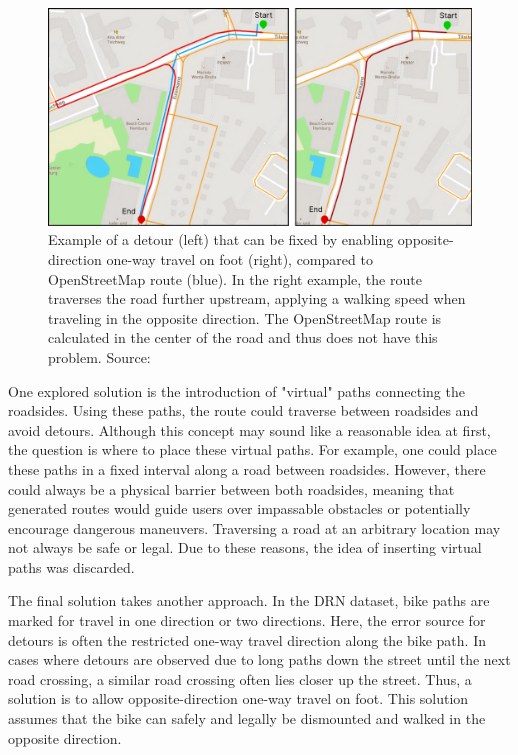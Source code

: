 \begin{figure}[t]
\centering
\includegraphics[width=\linewidth]{images/oneway-travel-fix.pdf}
\caption{Example of a detour (left) that can be fixed by enabling opposite-direction one-way travel on foot (right), compared to OpenStreetMap route (blue). In the right example, the route traverses the road further upstream, applying a walking speed when traveling in the opposite direction. The OpenStreetMap route is calculated in the center of the road and thus does not have this problem. Source: \cite{lorenz_2022}}
\label{fig:oneway-travel-fix}
\end{figure}

One explored solution is the introduction of "virtual" paths connecting the roadsides. Using these paths, the route could traverse between roadsides and avoid detours. Although this concept may sound like a reasonable idea at first, the question is where to place these virtual paths. For example, one could place these paths in a fixed interval along a road between roadsides. However, there could always be a physical barrier between both roadsides, meaning that generated routes would guide users over impassable obstacles or potentially encourage dangerous maneuvers. Traversing a road at an arbitrary location may not always be safe or legal. Due to these reasons, the idea of inserting virtual paths was discarded.

The final solution takes another approach. In the DRN dataset, bike paths are marked for travel in one direction or two directions. Here, the error source for detours is often the restricted one-way travel direction along the bike path. In cases where detours are observed due to long paths down the street until the next road crossing, a similar road crossing often lies closer up the street. Thus, a solution is to allow opposite-direction one-way travel on foot. This solution assumes that the bike can safely and legally be dismounted and walked in the opposite direction.

